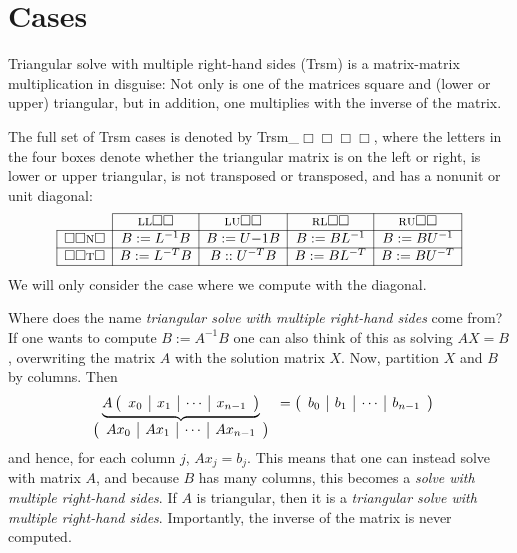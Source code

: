 \chapter{Cases}
Triangular solve with multiple right-hand sides  ({\sc Trsm}) 
is a matrix-matrix multiplication in disguise:
Not only is one of the matrices square and (lower or upper) triangular, but in addition, one multiplies with the inverse of the matrix.

The full set of 
{\sc Trsm} cases 
is denoted by {\sc Trsm\_$\Box \Box \Box \Box $}, 
where the letters in the four boxes denote whether the 
triangular matrix is on the {\sc l}eft or {\sc r}ight,
is {\sc l}ower or {\sc u}pper triangular, 
is {\sc n}ot transposed or {\sc t}ransposed, 
and has a {\sc n}onunit or {\sc u}nit diagonal:
\[
\begin{array}{c |  c   |   c  | c | c |} \cline{2-5}
&
{\mbox{\sc l} \mbox{\sc l} \Box \Box }
&
{\mbox{\sc l} \mbox{\sc u} \Box \Box }
&
{\mbox{\sc r} \mbox{\sc l} \Box \Box }
&
{\mbox{\sc r} \mbox{\sc u} \Box \Box }
  \\
\hline
\multicolumn{1}{|c |}{ \Box \Box \mbox{\sc n} \Box} & B := L^{-1} B & B := U{-1} B & B := B L^{-1} & B := B U^{-1} \\
\hline
\multicolumn{1}{|c |}{ \Box \Box \mbox{\sc t} \Box} & B := L^{-T} B & B :: U^{-T} B & B := B L^{-T} & B := B U^{-T} \\
\hline
\end{array}
\]
We will only consider the case where we compute with the diagonal.

Where does the name {\em triangular solve with multiple right-hand sides} come from?
If one wants to compute $ B := A^{-1} B $ one can also think of this as solving $ A X = B $, overwriting the matrix $ A $ with the solution matrix $ X $.  Now, partition $ X $ and $ B $ by columns.  Then
\[
\begin{array}[t]{c}
\underbrace{
	A \left( \begin{array}{c | c | c | c}
x_0 & x_1 & \cdots & x_{n-1}
\end{array}\right)
}
\\
\left( \begin{array}{c | c | c | c}
A x_0 & A x_1 & \cdots & A x_{n-1}
\end{array}\right)
\end{array}
=
\left( \begin{array}{c | c | c | c}
b_0 & b_1 & \cdots & b_{n-1}
\end{array}\right)
\]
and hence, for each column $ j $, 
$ A x_j = b_j $.  This means that one can instead
solve with matrix $ A $, and because $ B $ has many columns, this becomes a {\em solve with multiple right-hand sides}.  If $ A $ is triangular, then 
it is a {\em triangular solve with multiple right-hand sides}.  Importantly, the inverse of the matrix is never computed.